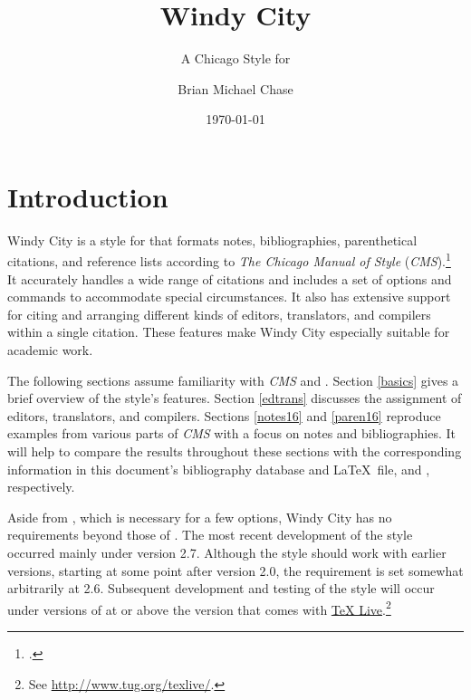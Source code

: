 \documentclass[11pt,letterpaper,oneside]{article}
\begin{document}
\title{Windy City}
\subtitle{A Chicago Style for \biblatex}
\author{Brian Michael Chase}
\date{\today}
\maketitle
\tableofcontents{}

\newpage

\section{Introduction}
\label{intro}


Windy City is a style for \biblatex that formats notes,
bibliographies, parenthetical citations, and reference lists according
to \textit{The Chicago Manual of Style}
(\textit{CMS}).\footcite{chicago2010} It accurately handles a wide
range of citations and includes a set of options and commands to
accommodate special circumstances. It also has extensive support for
citing and arranging different kinds of editors, translators, and
compilers within a single citation. These features make Windy City
especially suitable for academic work.

The following sections assume familiarity with \textit{CMS} and
\biblatex. Section \ref{basics} gives a brief overview of the style's
features. Section \ref{edtrans} discusses the assignment of editors,
translators, and compilers. Sections \ref{notes16} and \ref{paren16}
reproduce examples from various parts of \textit{CMS} with a focus on
notes and bibliographies. It will help to compare the results
throughout these sections with the corresponding information in this
document's bibliography database and \LaTeX\ file,
 and , respectively.

Aside from \biber, which is necessary for a few options, Windy City
has no requirements beyond those of \biblatex. The most recent
development of the style occurred mainly under \biblatex version 2.7.
Although the style should work with earlier versions, starting at some
point after version 2.0, the requirement is set somewhat arbitrarily
at 2.6. Subsequent development and testing of the style will occur
under versions of \biblatex at or above the version that comes with
\href{http://www.tug.org/texlive/}{TeX Live}.\footnote{See
\url{http://www.tug.org/texlive/}.}
\end{document}
